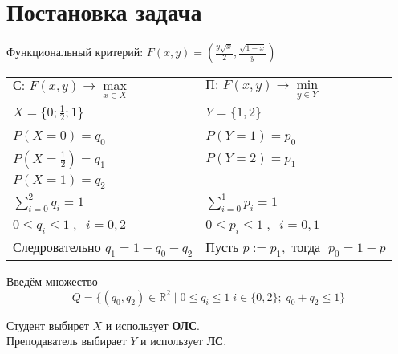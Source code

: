 \section{Постановка задача}

\begin{flushleft}

	Функциональный критерий: 
	$F(x, y) = (\frac{y\sqrt{x}}{2},\frac{\sqrt{1-x}}{y})$
	

	
	\begin{center}
	\begin{tabu} to 0.8 \textwidth {X[c] X[c]}
		$\textrm{С:  }F(x, y) \rightarrow \max \limits_{x\in X}$	&
		$\textrm{П:  }F(x, y) \rightarrow \min \limits_{y \in Y}$ \\
		$X = \{ 0; \frac{1}{2}; 1\}$ & $Y = \{1, 2\}$	\\
		\\
		$P(X=0)=q_0$ & $P(Y=1)=p_0$ \\
		$P(X=\frac{1}{2})=q_1$ & $P(Y=2)=p_1$ \\
		$P(X=1)=q_2$ & 
		\\
		$\sum \limits_{i=0}^2 q_i=1$ & $\sum \limits_{i=0}^1 p_i=1$ \\
		$0 \leqslant q_i \leqslant 1 \;,\;\; i=\overline{0,2}$ &
		$0 \leqslant p_i \leqslant 1 \;,\;\; i=\overline{0,1}$  \\
		\\
		$\textrm{Следровательно  } q_1 = 1-q_0-q_2$ & 
		$\textrm{Пусть  } p := p_1, \textrm{ тогда }\; p_0=1-p$ 
	\end{tabu}	
	\end{center}

	Введём множество 
	\begin{equation}
		Q=\{(q_0,q_2) \in \mathbb{R}^2 \; | \;
		0 \leqslant q_i \leqslant 1 \; i\in\{0,2\}; \; 
		q_0 + q_2 \leqslant 1\}	
	\end{equation}


	Студент выбирет $X$ и использует \textbf{ОЛС}. \\
	Преподаватель выбирает $Y$ и использует \textbf{ЛС}.\\
\end{flushleft}